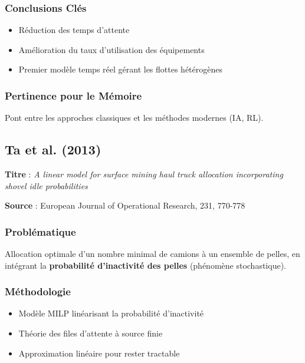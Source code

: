 \documentclass[12pt,a4paper]{article}
\begin{document}
\subsubsection{Conclusions Cl\'es}

\begin{itemize}
    \item R\'eduction des temps d'attente
    \item Am\'elioration du taux d'utilisation des \'equipements
    \item Premier mod\`ele temps r\'eel g\'erant les flottes h\'et\'erog\`enes
\end{itemize}

\subsubsection{Pertinence pour le M\'emoire}

Pont entre les approches classiques et les m\'ethodes modernes (IA, RL).

\subsection{Ta et al. (2013)}

\textbf{Titre} : \textit{A linear model for surface mining haul truck allocation incorporating shovel idle probabilities}

\textbf{Source} : European Journal of Operational Research, 231, 770-778

\subsubsection{Probl\'ematique}

Allocation optimale d'un nombre minimal de camions \`a un ensemble de pelles, en int\'egrant la \textbf{probabilit\'e d'inactivit\'e des pelles} (ph\'enom\`ene stochastique).

\subsubsection{M\'ethodologie}

\begin{itemize}
    \item Mod\`ele MILP lin\'earisant la probabilit\'e d'inactivit\'e
    \item Th\'eorie des files d'attente \`a source finie
    \item Approximation lin\'eaire pour rester tractable
\end{itemize}
\end{document}
